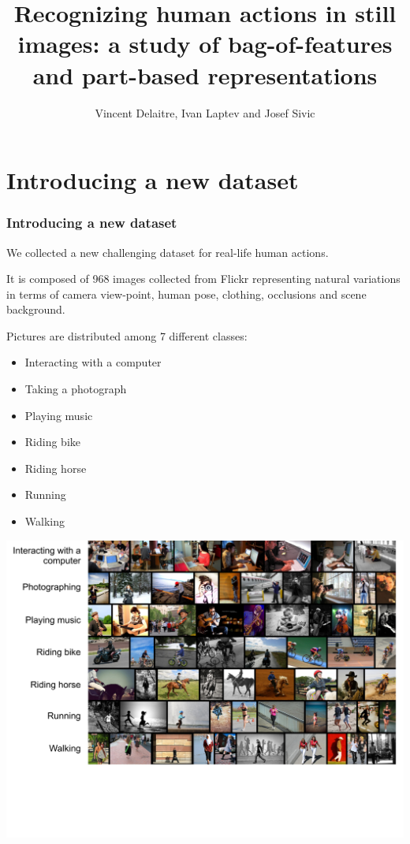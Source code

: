 \documentclass{beamer}
\title{Recognizing human actions in still images:
a study of bag-of-features and part-based
representations}
\author{Vincent Delaitre, Ivan Laptev and Josef Sivic}
\begin{document}
\maketitle

\begin{frame}
\tableofcontents
\end{frame}

\section{Introducing a new dataset}
\begin{frame}
\frametitle{Introducing a new dataset}
We collected a new challenging dataset for real-life human actions. 

It is composed of 968 images collected from Flickr representing natural variations in terms of 
camera view-point, human pose, clothing, occlusions and scene background.

Pictures are distributed among 7 different classes: 
\begin{itemize}
\item Interacting with a computer
\item Taking a photograph
\item Playing music
\item Riding bike
\item Riding horse
\item Running
\item Walking
\end{itemize}

\end{frame}


\begin{frame}
\includegraphics[width=1\linewidth]{figs/my_dataset_cropped.pdf}
\end{frame}
\end{document}
